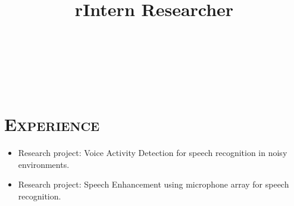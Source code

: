\begin{resume}

\begin{formatb}
  \title{r}\\
  \\
  \body\\
\end{formatb}

\section{\textsc{Experience}}

\title{Intern Researcher}
\begin{position}
\vspace*{-8pt}
\begin{itemize}
\item Research project: Voice Activity Detection for speech recognition in noisy environments.
\vspace*{-2pt}
\item Research project: Speech Enhancement using microphone array for speech recognition.
\end{itemize} 
\end{position}



\end{resume}
